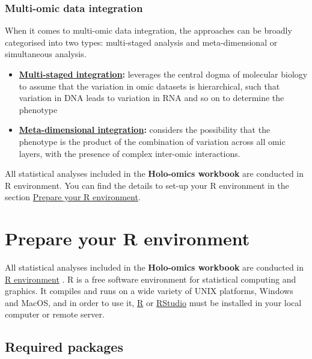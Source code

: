 \documentclass[
]{book}
\begin{document}
\hypertarget{multi-omic-data-integration}{%
\subsubsection*{Multi-omic data integration}\label{multi-omic-data-integration}}

When it comes to multi-omic data integration, the approaches can be broadly categorised into two types: multi-staged analysis and meta-dimensional or simultaneous analysis.

\begin{itemize}
\item
  \textbf{\protect\hyperlink{multi-staged-integration}{Multi-staged integration}:} leverages the central dogma of molecular biology to assume that the variation in omic datasets is hierarchical, such that variation in DNA leads to variation in RNA and so on to determine the phenotype
\item
  \textbf{\protect\hyperlink{meta-dimensional-integration}{Meta-dimensional integration}:} considers the possibility that the phenotype is the product of the combination of variation across all omic layers, with the presence of complex inter-omic interactions.
\end{itemize}

All statistical analyses included in the \textbf{Holo-omics workbook} are conducted in R environment. You can find the details to set-up your R environment in the section \protect\hyperlink{prepare-r}{Prepare your R environment}.

\hypertarget{prepare-r}{%
\section{Prepare your R environment}\label{prepare-r}}

All statistical analyses included in the \textbf{Holo-omics workbook} are conducted in \href{https://en.wikipedia.org/wiki/R_(programming_language)}{R environment} \citep{R_Development_Core_Team2008-gd}. R is a free software environment for statistical computing and graphics. It compiles and runs on a wide variety of UNIX platforms, Windows and MacOS, and in order to use it, \href{https://cran.r-project.org/}{R} or \href{https://posit.co/downloads/}{RStudio} must be installed in your local computer or remote server.

\hypertarget{required-packages}{%
\subsection*{Required packages}\label{required-packages}}
\end{document}
